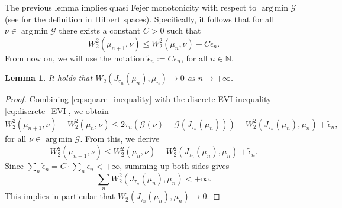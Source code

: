 \documentclass[11pt]{article}
\DeclareMathOperator*{\argmin}{arg\,min}
\newtheorem{lemma}[theorem]{Lemma}
\newcommand{\cG}{\mathcal{G}}
\newcommand{\N}{\mathbb{N}}
\numberwithin{equation}{section}
\begin{document}
The previous lemma implies quasi Fejer monotonicity with respect to $\argmin \cG$ (see \cite[Definition 5.32]{BCombettes} for the definition in Hilbert spaces). Specifically, it follows that for all $\nu \in \argmin \cG$ there exists a constant $C > 0$ such that
\begin{equation}
	W_2^2(\mu_{n+1},\nu)\leq W_2^2( \mu_n,\nu)+C\epsilon_n.
\end{equation}
From now on, we will use the notation $\tilde{\epsilon}_n := C \epsilon_n$, for all $n\in \N$.
\begin{lemma}\label{lem:JKO_asymptotic_regularity}
	It holds that $W_2(J_{\tau_n}(\mu_n),\mu_n)\to 0$ as $n\to +\infty$.
\end{lemma}
\begin{proof}
	Combining \eqref{eq:square_inequality} with the discrete EVI inequality \eqref{eq:discrete_EVI}, we obtain
	\begin{equation}\label{eq:inexact_discrete_EVI}
		W_2^2(\mu_{n+1},\nu) - W_2^2(\mu_n,\nu) \leq 2\tau_n \left(\cG(\nu) -  \cG(J_{\tau_n}(\mu_n))\right) - W_2^2(J_{\tau_n}(\mu_n),\mu_n) +\tilde{\epsilon}_n,
	\end{equation}
	for all $\nu \in \argmin \cG$. From this, we derive
	\begin{equation*}
		W_2^2(\mu_{n+1},\nu) \leq  W_2^2(\mu_n,\nu) -  W_2^2(J_{\tau_n}(\mu_n),\mu_n) +\tilde{\epsilon}_n.
	\end{equation*}
	Since $\sum_n \tilde{\epsilon}_n = C \cdot \sum_n \epsilon_n <+\infty$, summing up both sides gives
	\begin{equation}\label{eq1}
		\sum_n W_2^2(J_{\tau_n}(\mu_n),\mu_n)<+\infty.
	\end{equation}
	This implies in particular that $W_2(J_{\tau_n}(\mu_n),\mu_n)\to 0$.
\end{proof}
\end{document}
